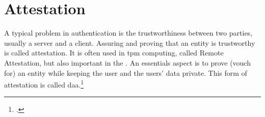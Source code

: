 \section{Attestation}

A typical problem in authentication is the trustworthiness between two parties, usually a server and a client. Assuring and proving that an entity is trustworthy is called attestation. It is often used in \gls{tpm} computing, called \frqq Remote Attestation\flqq, but also important in the \wa. An essentials aspect is to prove (\frqq vouch for\flqq) an entity while keeping the user and the users' data private. This form of attestation is called \gls{daa}.\footcites[See][]{trusted-comp}[See][501]{1698485}[See][4]{Coker:2011:PRA:1989153.1989155}